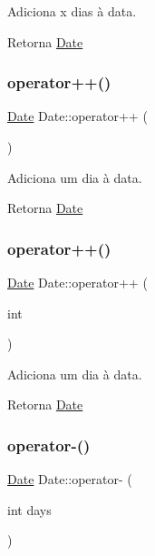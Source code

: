 Adiciona x dias à data. 

\begin{DoxyReturn}{Retorna}
\hyperlink{classDate}{Date} 
\end{DoxyReturn}
\mbox{\label{classDate_a0c5386da90c6834a3e7a110b02e2abaa}} 
\subsubsection{\texorpdfstring{operator++()}{operator++()}\hspace{0.1cm}{\footnotesize\ttfamily [1/2]}}
{\footnotesize\ttfamily \hyperlink{classDate}{Date} Date\+::operator++ (\begin{DoxyParamCaption}{ }\end{DoxyParamCaption})}



Adiciona um dia à data. 

\begin{DoxyReturn}{Retorna}
\hyperlink{classDate}{Date} 
\end{DoxyReturn}
\mbox{\label{classDate_a63f7060a7a7997e289e5e885f84557e5}} 
\subsubsection{\texorpdfstring{operator++()}{operator++()}\hspace{0.1cm}{\footnotesize\ttfamily [2/2]}}
{\footnotesize\ttfamily \hyperlink{classDate}{Date} Date\+::operator++ (\begin{DoxyParamCaption}\item[{int}]{ }\end{DoxyParamCaption})}



Adiciona um dia à data. 

\begin{DoxyReturn}{Retorna}
\hyperlink{classDate}{Date} 
\end{DoxyReturn}
\mbox{\label{classDate_afed6ca708a5c8e9f201e760995002dd1}} 
\subsubsection{\texorpdfstring{operator-\/()}{operator-()}}
{\footnotesize\ttfamily \hyperlink{classDate}{Date} Date\+::operator-\/ (\begin{DoxyParamCaption}\item[{int}]{days }\end{DoxyParamCaption})}



